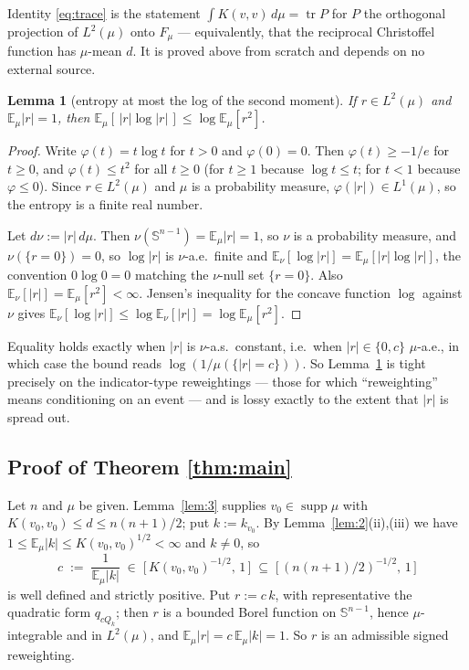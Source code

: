 \documentclass[11pt]{article}
\newtheorem{lemma}[theorem]{Lemma}
\theoremstyle{remark}
\newcommand{\Sph}{\mathbb{S}^{n-1}}
\newcommand{\Ex}{\mathbb{E}}
\newcommand{\Fm}{F_\mu}
\newcommand{\supp}{\operatorname{supp}}
\DeclareMathOperator{\tr}{tr}
\begin{document}
\noindent Identity \eqref{eq:trace} is the statement $\int K(v,v)\,d\mu = \tr P$ for $P$ the
orthogonal projection of $L^2(\mu)$ onto $\Fm$ --- equivalently, that the reciprocal
Christoffel function has $\mu$-mean $d$. It is proved above from scratch and depends on no
external source.

\begin{lemma}[entropy at most the log of the second moment]\label{lem:4}
If $r\in L^2(\mu)$ and $\Ex_\mu|r|=1$, then
$\Ex_\mu[\,|r|\log|r|\,]\leq\log\Ex_\mu[r^2]$.
\end{lemma}

\begin{proof}
Write $\varphi(t)=t\log t$ for $t>0$ and $\varphi(0)=0$. Then $\varphi(t)\geq -1/e$ for
$t\geq 0$, and $\varphi(t)\leq t^2$ for all $t\geq 0$ (for $t\geq 1$ because $\log t\leq t$;
for $t<1$ because $\varphi\leq 0$). Since $r\in L^2(\mu)$ and $\mu$ is a probability measure,
$\varphi(|r|)\in L^1(\mu)$, so the entropy is a finite real number.

Let $d\nu:=|r|\,d\mu$. Then $\nu(\Sph)=\Ex_\mu|r|=1$, so $\nu$ is a probability measure, and
$\nu(\{r=0\})=0$, so $\log|r|$ is $\nu$-a.e.\ finite and
$\Ex_\nu[\log|r|]=\Ex_\mu[|r|\log|r|]$, the convention $0\log 0=0$ matching the $\nu$-null set
$\{r=0\}$. Also $\Ex_\nu[|r|]=\Ex_\mu[r^2]<\infty$. Jensen's inequality for the concave
function $\log$ against $\nu$ gives
$\Ex_\nu[\log|r|]\leq\log\Ex_\nu[|r|]=\log\Ex_\mu[r^2]$.
\end{proof}

\noindent Equality holds exactly when $|r|$ is $\nu$-a.s.\ constant, i.e.\ when
$|r|\in\{0,c\}$ $\mu$-a.e., in which case the bound reads $\log(1/\mu(\{|r|=c\}))$. So
Lemma~\ref{lem:4} is tight precisely on the indicator-type reweightings --- those for which
``reweighting'' means conditioning on an event --- and is lossy exactly to the extent that
$|r|$ is spread out.

\subsection*{Proof of Theorem \ref{thm:main}}

Let $n$ and $\mu$ be given. Lemma~\ref{lem:3} supplies $v_0\in\supp\mu$ with
$K(v_0,v_0)\leq d\leq n(n+1)/2$; put $k:=k_{v_0}$. By Lemma~\ref{lem:2}(ii),(iii) we have
$1\leq\Ex_\mu|k|\leq K(v_0,v_0)^{1/2}<\infty$ and $k\neq 0$, so
\[
  c \;:=\; \frac{1}{\Ex_\mu|k|} \;\in\; \big[\,K(v_0,v_0)^{-1/2},\,1\,\big]
  \;\subseteq\; \big[\,(n(n+1)/2)^{-1/2},\,1\,\big]
\]
is well defined and strictly positive. Put $r:=c\,k$, with representative the quadratic form
$q_{cQ_k}$; then $r$ is a bounded Borel function on $\Sph$, hence $\mu$-integrable and in
$L^2(\mu)$, and $\Ex_\mu|r|=c\,\Ex_\mu|k|=1$. So $r$ is an admissible signed reweighting.
\end{document}
